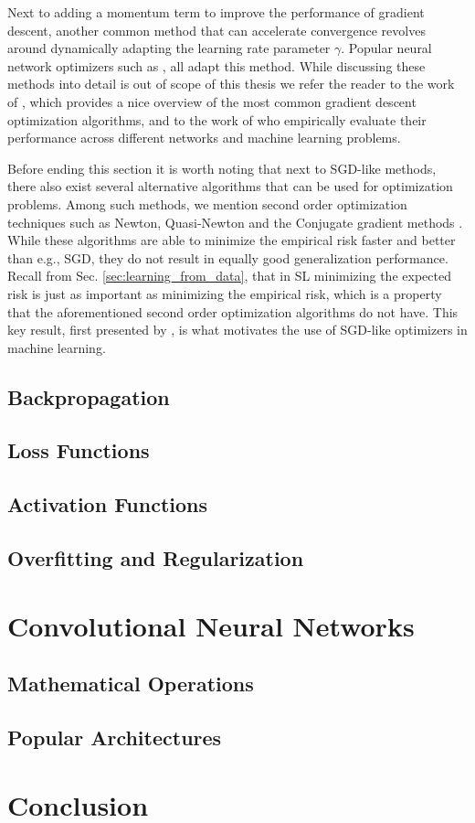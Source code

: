 Next to adding a momentum term to improve the performance of gradient descent, another common method that can accelerate convergence revolves around dynamically adapting the learning rate parameter $\gamma$. Popular neural network optimizers such as \texttt{} , all adapt this method. While discussing these methods into detail is out of scope of this thesis we refer the reader to the work of \cite{ruder2016overview}, which provides a nice overview of the most common gradient descent optimization algorithms, and to the work of \citet{schmidt2020descending} who empirically evaluate their performance across different networks and machine learning problems. 

Before ending this section it is worth noting that next to SGD-like methods, there also exist several alternative algorithms that can be used for optimization problems. Among such methods, we mention second order optimization techniques such as Newton, Quasi-Newton and the Conjugate gradient methods \citet{tan2019review}. While these algorithms are able to minimize the empirical risk faster and better than e.g., SGD, they do not result in equally good generalization performance. Recall from Sec. \ref{sec:learning_from_data}, that in SL minimizing the expected risk is just as important as minimizing the empirical risk, which is a property that the aforementioned second order optimization algorithms do not have. This key result, first presented by \citet{bottou201113}, is what motivates the use of SGD-like optimizers in machine learning.       

\subsection{Backpropagation}
\label{sec:backprop}


\subsection{Loss Functions}
\label{sec:loss_functions}




\subsection{Activation Functions}
\label{sec:activations}

\subsection{Overfitting and Regularization}
\label{sec:regularization}


\section{Convolutional Neural Networks}
\label{sec:convolutional_networks}

\subsection{Mathematical Operations}
\label{sec:operations}

\subsection{Popular Architectures}
\label{sec:architectures}


\section{Conclusion}
\label{sec:conclusion01}
